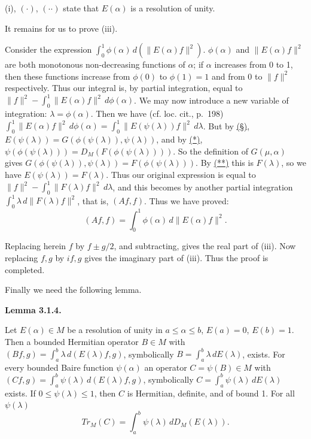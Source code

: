 \documentclass[twoside,leqno]{article}
\newcommand{\TrM}{Tr_M}
\newcommand{\StatementTarget}[1]{\phantomsection\hypertarget{stmt:#1}{}}
\newcommand{\EquationRef}[2]{\hyperlink{eq:#1}{#2}}
\newenvironment{statement}[2]{%
  \par\medskip
  \noindent\StatementTarget{#1}\hspace*{\parindent}\textbf{#2.}\ \itshape\ignorespaces
}{\par}
\begin{document}
(i), \EquationRef{3.1.bullet}{$(\mathord{\cdot})$},
\EquationRef{3.1.doublebullet}{$(\mathord{\cdot}\mathord{\cdot})$} state
that $E(\alpha)$ is a resolution of unity.

It remains for us to prove (iii).

Consider the expression
$\int_0^1\phi(\alpha)\,d(\lVert E(\alpha)f\rVert^2)$.
$\phi(\alpha)$ and $\lVert E(\alpha)f\rVert^2$ are both monotonous
non-decreasing functions of $\alpha$; if $\alpha$ increases from 0 to 1,
then these functions increase from $\phi(0)$ to $\phi(1)=1$ and from 0 to
$\lVert f\rVert^2$ respectively. Thus our integral is, by partial
integration, equal to
$\lVert f\rVert^2-\int_0^1\lVert E(\alpha)f\rVert^2\,d\phi(\alpha)$.
We may now introduce a new variable of integration: $\lambda=\phi(\alpha)$.
Then we have (cf. loc. cit., p.~198)
$\int_0^1\lVert E(\alpha)f\rVert^2\,d\phi(\alpha)
=\int_0^1\lVert E(\psi(\lambda))f\rVert^2\,d\lambda$.
But by \EquationRef{3.1.section}{(\S)},
$E(\psi(\lambda))=G(\phi(\psi(\lambda)),\psi(\lambda))$, and by
\EquationRef{star}{(*)},
$\psi(\phi(\psi(\lambda)))=D_M(F(\phi(\psi(\lambda))))$. So the definition
of $G(\mu,\alpha)$ gives
$G(\phi(\psi(\lambda)),\psi(\lambda))
=F(\phi(\psi(\lambda)))$.
By \EquationRef{starstar}{(**)} this is $F(\lambda)$, so we have
$E(\psi(\lambda))=F(\lambda)$. Thus our original expression is equal to
$\lVert f\rVert^2-\int_0^1\lVert F(\lambda)f\rVert^2\,d\lambda$,
and this becomes by another partial integration
$\int_0^1\lambda\,d\lVert F(\lambda)f\rVert^2$, that is, $(Af,f)$.
Thus we have proved:
\[
 (Af,f)=\int_0^1\phi(\alpha)\,d\lVert E(\alpha)f\rVert^2.
\]

Replacing herein $f$ by $f\pm g/2$, and subtracting, gives the real part of
(iii). Now replacing $f,g$ by $if,g$ gives the imaginary part of (iii).
Thus the proof is completed.

Finally we need the following lemma.

\begin{statement}{lemma:3.1.4}{Lemma 3.1.4}
Let $E(\alpha)\in M$ be a resolution of unity in $a\leq\alpha\leq b$,
$E(a)=0$, $E(b)=1$. Then a bounded Hermitian operator $B\in M$ with
$(Bf,g)=\int_a^b\lambda\,d(E(\lambda)f,g)$,
symbolically $B=\int_a^b\lambda\,dE(\lambda)$, exists. For every bounded
Baire function $\psi(\alpha)$ an operator $C=\psi(B)\in M$ with
$(Cf,g)=\int_a^b\psi(\lambda)\,d(E(\lambda)f,g)$,
symbolically $C=\int_a^b\psi(\lambda)\,dE(\lambda)$ exists. If
$0\leq\psi(\lambda)\leq1$, then $C$ is Hermitian, definite, and of bound 1.
For all $\psi(\lambda)$
\[
 \TrM(C)=\int_a^b\psi(\lambda)\,dD_M(E(\lambda)).
\]
\end{statement}
\end{document}
